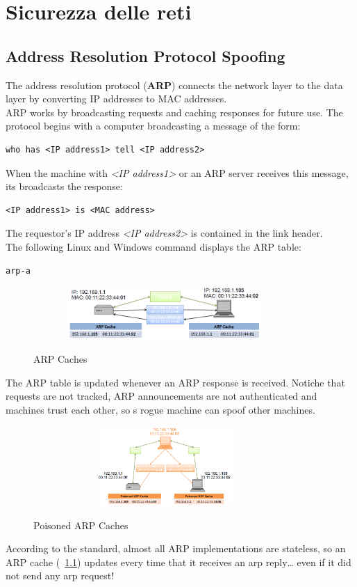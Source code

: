 \chapter{Sicurezza delle reti}
\section{Address Resolution Protocol Spoofing}
The address resolution protocol (\textbf{ARP}) connects the network layer to the data layer by converting IP addresses to MAC addresses. \\
ARP works by broadcasting requests and caching responses for future use. The protocol begins with a computer broadcasting a message of the form: 
\begin{lstlisting}
who has <IP address1> tell <IP address2>
\end{lstlisting}
When the machine with \textit{<IP address1>} or an ARP server receives this message, its broadcasts the response:
\begin{lstlisting}
<IP address1> is <MAC address>
\end{lstlisting}
The requestor's IP address \textit{<IP address2>} is contained in the link header.\\
The following Linux and Windows command displays the ARP table:
\begin{lstlisting}
arp-a
\end{lstlisting}
\begin{figure}[htbp]
	\centering%
	\subfigure%
	{\includegraphics[height=2cm, width=10cm, keepaspectratio]{Immagini/reti/ARP_Caches.png}}
	\caption{ARP Caches\label{fig:ARP_Caches}} 	
\end{figure}
The ARP table is updated whenever an ARP response is received. Notiche that requests are not tracked, ARP announcements are not authenticated and machines trust each other, so s rogue machine can spoof other machines.\begin{figure}[htbp]
	\centering%
	\subfigure%
	{\includegraphics[height=3cm, width=10cm, keepaspectratio]{Immagini/reti/Poisoned_ARP_Caches.png}}
	\caption{Poisoned ARP Caches\label{fig:Poisoned_ARP_Caches}} 	
\end{figure}
According to the standard, almost all ARP implementations are stateless, so an ARP cache (\figurename ~\ref{fig:ARP_Caches}) updates every time that it receives an arp reply… even if it did not send any arp request!


